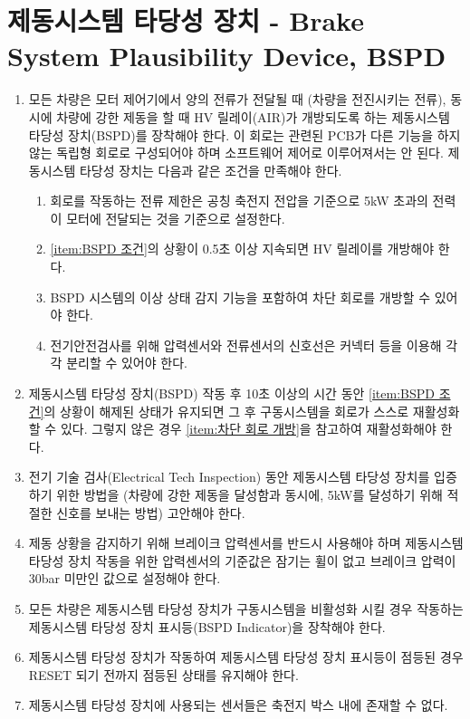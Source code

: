\documentclass[final,a4paper,10pt]{report}
\begin{document}
\section{제동시스템 타당성 장치 - Brake System Plausibility Device, BSPD}
\begin{enumerate}
  \item 모든 차량은 모터 제어기에서 양의 전류가 전달될 때 (차량을 전진시키는 전류), 동시에 차량에 강한 제동을 할 때 HV 릴레이(AIR)가 개방되도록 하는 제동시스템 타당성 장치(BSPD)를 장착해야 한다. 이 회로는 관련된 PCB가 다른 기능을 하지 않는 독립형 회로로 구성되어야 하며 소프트웨어 제어로 이루어져서는 안 된다. 제동시스템 타당성 장치는 다음과 같은 조건을 만족해야 한다. \label{item:BSPD 조건}
    \begin{enumerate}
      \item 회로를 작동하는 전류 제한은 공칭 축전지 전압을 기준으로 5kW 초과의 전력이 모터에 전달되는 것을 기준으로 설정한다.
      \item \cref{item:BSPD 조건}의 상황이 0.5초 이상 지속되면 HV 릴레이를 개방해야 한다.
      \item BSPD 시스템의 이상 상태 감지 기능을 포함하여 차단 회로를 개방할 수 있어야 한다.
      \item 전기안전검사를 위해 압력센서와 전류센서의 신호선은 커넥터 등을 이용해 각각 분리할 수 있어야 한다.
    \end{enumerate}
    
  \item 제동시스템 타당성 장치(BSPD) 작동 후 10초 이상의 시간 동안 \cref{item:BSPD 조건}의 상황이 해제된 상태가 유지되면 그 후 구동시스템을 회로가 스스로 재활성화할 수 있다. 그렇지 않은 경우 \cref{item:차단 회로 개방}을 참고하여 재활성화해야 한다.
  \item 전기 기술 검사(Electrical Tech Inspection) 동안 제동시스템 타당성 장치를 입증하기 위한 방법을 (차량에 강한 제동을 달성함과 동시에, 5kW를 달성하기 위해 적절한 신호를 보내는 방법) 고안해야 한다.
  \item 제동 상황을 감지하기 위해 브레이크 압력센서를 반드시 사용해야 하며 제동시스템 타당성 장치 작동을 위한 압력센서의 기준값은 잠기는 휠이 없고 브레이크 압력이 30bar 미만인 값으로 설정해야 한다.
  \item 모든 차량은 제동시스템 타당성 장치가 구동시스템을 비활성화 시킬 경우 작동하는 제동시스템 타당성 장치 표시등(BSPD Indicator)을 장착해야 한다.
  \item 제동시스템 타당성 장치가 작동하여 제동시스템 타당성 장치 표시등이 점등된 경우 RESET 되기 전까지 점등된 상태를 유지해야 한다.
  \item 제동시스템 타당성 장치에 사용되는 센서들은 축전지 박스 내에 존재할 수 없다.
\end{enumerate}
\end{document}
